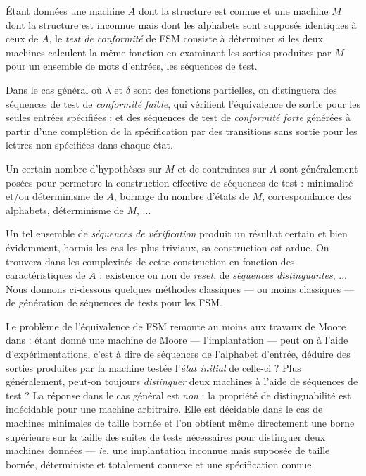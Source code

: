 \'Etant donn\'ees une machine $A$ dont la structure est connue et
une machine $M$ dont la structure est inconnue mais dont les alphabets
sont suppos\'es identiques \`a ceux de $A$, le  \emph{test
de conformit\'e} de \textsf{FSM} consiste \`a d\'eterminer si les
deux machines calculent la m\^eme fonction en examinant les sorties
produites par $M$ pour un ensemble de mots d'entr\'ees, les
s\'equences de test.

Dans le cas g\'en\'eral o\`u $\lambda$ et $\delta$ sont des
fonctions partielles, on
distinguera\cite{sidhu-study-fsmtest} des s\'equences de test de
\emph{conformit\'e faible}, qui v\'erifient l'\'equivalence de sortie pour
les seules entr\'ees sp\'ecifi\'ees ; et des s\'equences de
test de \emph{conformit\'e forte} g\'en\'er\'ees \`a partir d'une
compl\'etion de la sp\'ecification par des transitions sans sortie
pour les lettres non sp\'ecifi\'ees dans chaque \'etat. 

Un certain nombre d'hypoth\`eses sur $M$ et de contraintes sur $A$
sont g\'en\'eralement pos\'ees pour permettre la construction
effective de s\'equences de test : minimalit\'e et/ou
d\'eterminisme de $A$, bornage du nombre d'\'etats de $M$,
correspondance des alphabets, d\'eterminisme de $M$, ...

Un tel ensemble de  \emph{s\'equences de 
v\'erification} produit un r\'esultat certain et bien \'evidemment,
hormis les cas les plus triviaux, sa construction est ardue. On
trouvera dans \cite{lee96principles} les complexit\'es de cette
construction en fonction des caract\'eristiques de $A$ : existence ou non de \emph{reset}, de \emph{s\'equences
  distinguantes}, ... Nous donnons ci-dessous quelques m\'ethodes
classiques --- ou moins classiques --- de
g\'en\'eration  de s\'equences de tests pour les \textsf{FSM}. 

Le probl\`eme de
l'\'equivalence de \textsf{FSM} remonte au moins aux travaux de Moore dans
\cite{moore-gedanken} : \'etant donn\'e une machine de Moore ---
l'implantation --- peut on \`a l'aide d'exp\'erimentations, c'est
\`a dire de s\'equences de l'alphabet d'entr\'ee, d\'eduire des
sorties produites par la machine test\'ee l'\emph{\'etat initial} de
celle-ci ? Plus g\'en\'eralement, peut-on toujours \emph{distinguer} deux machines
\`a l'aide de s\'equences de test ? La r\'eponse dans le cas
g\'en\'eral est \emph{non} : la propri\'et\'e de
distinguabilit\'e est ind\'ecidable pour une machine
arbitraire. Elle est d\'ecidable dans le cas de machines minimales de
taille born\'ee et l'on obtient m\^eme directement une borne
sup\'erieure sur la taille des suites de tests n\'ecessaires pour
distinguer deux machines donn\'ees --- \emph{ie.} une implantation inconnue
mais suppos\'ee de taille born\'ee, d\'eterministe et totalement
connexe et une sp\'ecification connue.

